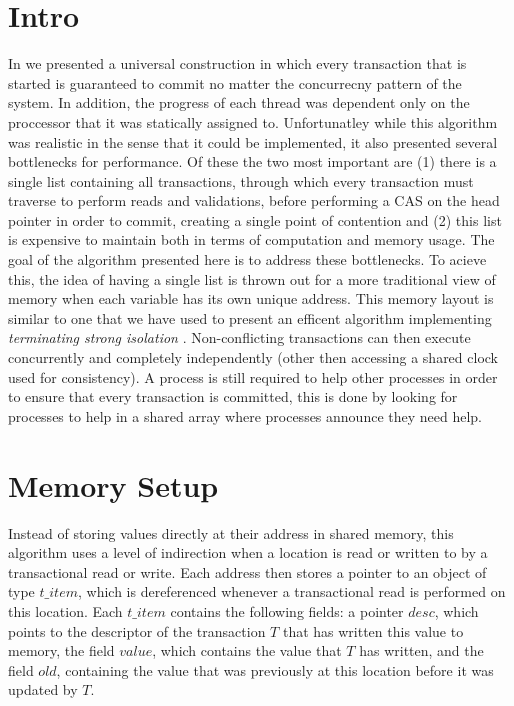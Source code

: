 \documentclass[runningheads,a4paper]{llncs}
\begin{document}
\section{Intro}
In \cite{} we presented a universal construction in which every transaction that is started is guaranteed to commit no matter the
concurrecny pattern of the system.
In addition, the progress of each thread was dependent only on the proccessor that it was statically assigned to.
Unfortunatley while this algorithm was realistic in the sense that it could be implemented, it also presented several bottlenecks
for performance.
Of these the two most important are (1) there is a single list containing all transactions, through which every transaction must
traverse to perform reads and validations, before performing a CAS on the head pointer in order to commit, creating a single point
of contention and (2) this list is expensive to maintain both in terms of computation and memory usage.
The goal of the algorithm presented here is to address these bottlenecks.
To acieve this, the idea of having a single list is thrown out for a more traditional view of memory when each variable has its own
unique address.
This memory layout is similar to one that we have used to present an efficent algorithm implementing \emph{terminating strong isolation} \cite{}.
Non-conflicting transactions can then execute concurrently and completely independently (other then accessing a shared clock used for consistency).
A process is still required to help other processes in order to ensure that every transaction is committed, this is done by looking for processes
to help in a shared array where processes announce they need help.



\section{Memory Setup}
Instead of storing values directly at their address in shared memory, this algorithm
uses a level of indirection when a location is read or written to by a transactional read or write.
Each address then stores a pointer to an object of type $t\_item$, which is dereferenced
whenever a transactional read is performed on this location.
Each $\mathit{t\_item}$ contains the following fields:
a pointer $\mathit{desc}$, which points to the descriptor of the transaction $T$ that has written
this value to memory,
the field $\mathit{value}$, which contains the value that $T$ has written,
and the field $\mathit{old}$, containing the value that was previously at this location before
it was updated by $T$.
\end{document}
